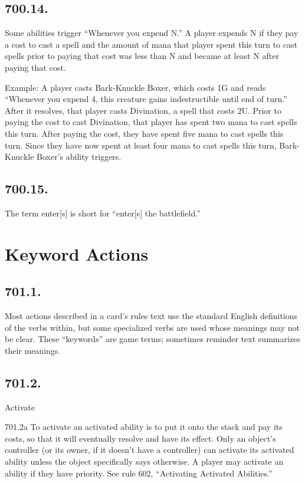 \subsection*{700.14.}
Some abilities trigger “Whenever you expend N.” A player expends N if they pay a cost to cast a spell and the amount of mana that player spent this turn to cast spells prior to paying that cost was less than N and became at least N after paying that cost.

Example: A player casts Bark-Knuckle Boxer, which costs {1}{G} and reads “Whenever you expend 4, this creature gains indestructible until end of turn.” After it resolves, that player casts Divination, a spell that costs {2}{U}. Prior to paying the cost to cast Divination, that player has spent two mana to cast spells this turn. After paying the cost, they have spent five mana to cast spells this turn. Since they have now spent at least four mana to cast spells this turn, Bark-Knuckle Boxer’s ability triggers.

\subsection*{700.15.}
The term enter[s] is short for “enter[s] the battlefield.”

\section{Keyword Actions}
\subsection*{701.1.}
Most actions described in a card’s rules text use the standard English definitions of the verbs within, but some specialized verbs are used whose meanings may not be clear. These “keywords” are game terms; sometimes reminder text summarizes their meanings.

\subsection*{701.2.}
Activate

701.2a To activate an activated ability is to put it onto the stack and pay its costs, so that it will eventually resolve and have its effect. Only an object’s controller (or its owner, if it doesn’t have a controller) can activate its activated ability unless the object specifically says otherwise. A player may activate an ability if they have priority. See rule 602, “Activating Activated Abilities.”


